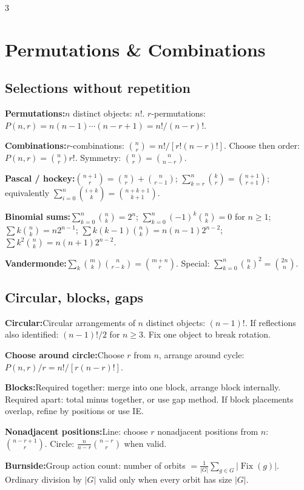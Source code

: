 \documentclass[10pt]{article}
\newcommand{\Fix}{\operatorname{Fix}}
\newenvironment{cheatitems}{\par\vspace{-1pt}}{\par\vspace{-1pt}}
\newcommand{\cheatrow}[2]{\par\noindent\textbf{#1:}\enspace #2\par}
\begin{document}
\begin{multicols}{3}
\section*{Permutations \& Combinations}
\subsection*{Selections without repetition}
\begin{cheatitems}
\cheatrow{Permutations}{$n$ distinct objects: $n!$. $r$-permutations: $P(n,r)=n(n-1)\cdots(n-r+1)=n!/(n-r)!$.}
\cheatrow{Combinations}{$r$-combinations: $\binom nr=n!/[r!(n-r)!]$. Choose then order: $P(n,r)=\binom nr r!$. Symmetry: $\binom nr=\binom n{n-r}$.}
\cheatrow{Pascal / hockey}{$\binom{n+1}{r}=\binom nr+\binom n{r-1}$; $\sum_{k=r}^{n}\binom kr=\binom{n+1}{r+1}$; equivalently $\sum_{i=0}^{n}\binom{i+k}{k}=\binom{n+k+1}{k+1}$.}
\cheatrow{Binomial sums}{$\sum_{k=0}^{n}\binom nk=2^n$; $\sum_{k=0}^{n}(-1)^k\binom nk=0$ for $n\ge1$; $\sum k\binom nk=n2^{n-1}$; $\sum k(k-1)\binom nk=n(n-1)2^{n-2}$; $\sum k^2\binom nk=n(n+1)2^{n-2}$.}
\cheatrow{Vandermonde}{$\sum_k\binom mk\binom n{r-k}=\binom{m+n}{r}$. Special: $\sum_{k=0}^{n}\binom nk^2=\binom{2n}{n}$.}
\end{cheatitems}

\subsection*{Circular, blocks, gaps}
\begin{cheatitems}
\cheatrow{Circular}{Circular arrangements of $n$ distinct objects: $(n-1)!$. If reflections also identified: $(n-1)!/2$ for $n\ge3$. Fix one object to break rotation.}
\cheatrow{Choose around circle}{Choose $r$ from $n$, arrange around cycle: $P(n,r)/r=n!/[r(n-r)!]$.}
\cheatrow{Blocks}{Required together: merge into one block, arrange block internally. Required apart: total minus together, or use gap method. If block placements overlap, refine by positions or use IE.}
\cheatrow{Nonadjacent positions}{Line: choose $r$ nonadjacent positions from $n$: $\binom{n-r+1}{r}$. Circle: $\frac{n}{n-r}\binom{n-r}{r}$ when valid.}
\cheatrow{Burnside}{Group action count: number of orbits $=\frac1{|G|}\sum_{g\in G}|\Fix(g)|$. Ordinary division by $|G|$ valid only when every orbit has size $|G|$.}
\end{cheatitems}


\end{multicols}
\end{document}
